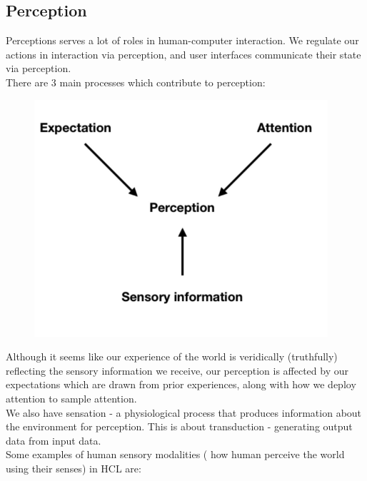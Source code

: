 \documentclass{article}
\begin{document}
\subsection{Perception}
Perceptions serves a lot of roles in human-computer interaction. We regulate our actions in interaction via perception, and user interfaces communicate their state via perception. \\
There are 3 main processes which contribute to perception:
\begin{figure}[H]
    \centering
    \includegraphics[width=0.3\linewidth]{Pictures/Screenshot 2023-02-22 at 15.33.15.png}
\end{figure}
Although it seems like our experience of the world is veridically (truthfully) reflecting the sensory information we receive, our perception is affected by our expectations which are drawn from prior experiences, along with how we deploy attention to sample attention. \\
We also have sensation - a physiological process that produces information about the environment for perception. This is about transduction - generating output data from input data. \\
Some examples of human sensory modalities ( how human perceive the world using their senses) in HCL are:
\end{document}

